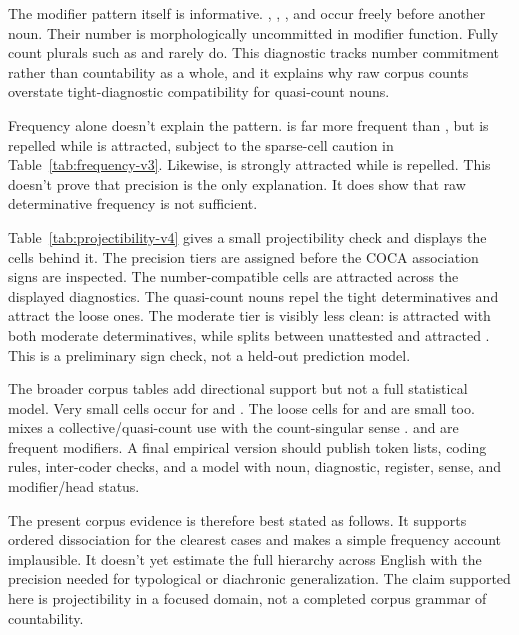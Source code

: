 \documentclass[12pt,a4paper]{article}
\begin{document}
The modifier pattern itself is informative. , , , and  occur freely before another noun. Their number is morphologically uncommitted in modifier function. Fully count plurals such as  and  rarely do. This diagnostic tracks number commitment rather than countability as a whole, and it explains why raw corpus counts overstate tight-diagnostic compatibility for quasi-count nouns.



Frequency alone doesn't explain the pattern.  is far more frequent than , but  is repelled while  is attracted, subject to the sparse-cell caution in Table~\ref{tab:frequency-v3}. Likewise,  is strongly attracted while  is repelled. This doesn't prove that precision is the only explanation. It does show that raw determinative frequency is not sufficient.



Table~\ref{tab:projectibility-v4} gives a small projectibility check and displays the cells behind it. The precision tiers are assigned before the COCA association signs are inspected. The number-compatible  cells are attracted across the displayed diagnostics. The quasi-count nouns repel the tight determinatives and attract the loose ones. The moderate tier is visibly less clean:  is attracted with both moderate determinatives, while  splits between unattested  and attracted . This is a preliminary sign check, not a held-out prediction model.

The broader corpus tables add directional support but not a full statistical model. Very small cells occur for  and . The loose cells for  and  are small too.  mixes a collective/quasi-count use with the count-singular sense .  and  are frequent modifiers. A final empirical version should publish token lists, coding rules, inter-coder checks, and a model with noun, diagnostic, register, sense, and modifier/head status.

The present corpus evidence is therefore best stated as follows. It supports ordered dissociation for the clearest cases and makes a simple frequency account implausible. It doesn't yet estimate the full hierarchy across English with the precision needed for typological or diachronic generalization. The claim supported here is projectibility in a focused domain, not a completed corpus grammar of countability.
\end{document}
